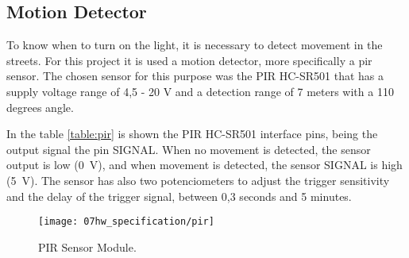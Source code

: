 \begin{table}[H]
	\centering
	
	\caption{LDR Module Interface Pins.}
	\label{table:ldr}
\end{table}

\clearpage
\subsection{Motion Detector}
To know when to turn on the light, it is necessary to detect movement in the streets. For this project it is used a motion detector, more specifically a \ac{pir} sensor. The chosen sensor for this purpose was the PIR HC-SR501 that has a supply voltage range of 4,5 - 20 V and a detection range of 7 meters with a 110 degrees angle.

In the table \ref{table:pir} is shown the PIR HC-SR501 interface pins, being the output signal the pin SIGNAL. When no movement is detected, the sensor output is low (0~V), and when movement is detected, the sensor SIGNAL is high (5~V). The sensor has also two potenciometers to adjust the trigger sensitivity and the delay of the trigger signal, between 0,3 seconds and 5 minutes.

\begin{figure}[H]
	\centering
	\texttt{[image: 07hw\_specification/pir]}
	\caption{PIR Sensor Module.}
	\label{fig:pir}
\end{figure}

\begin{table}[H]
	\centering
	
	\caption{PIR Module Interface Pins.}
	\label{table:pir}
\end{table}

